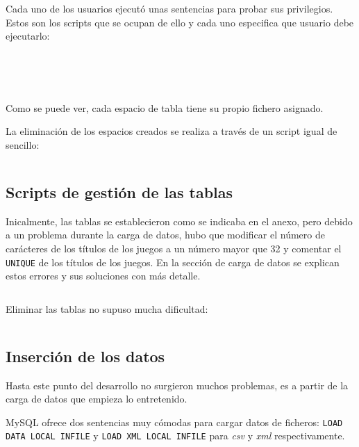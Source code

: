 \documentclass[a4paper, 11pt, oneside]{article} %
\newcommand{\scriptdir}{../scripts/} %
\begin{document}
Cada uno de los usuarios ejecutó unas sentencias para probar sus privilegios. Estos son los scripts que se ocupan de ello y cada uno especifica que usuario debe ejecutarlo:

\inputminted{mysql}{\scriptdir scripts/scripts_consulta_privilegios/gohan_queries.sql}
\inputminted{mysql}{\scriptdir scripts/scripts_consulta_privilegios/vegeta_queries.sql}
\inputminted{mysql}{\scriptdir scripts/scripts_consulta_privilegios/videl_queries.sql}
\inputminted{mysql}{\scriptdir scripts/scripts_consulta_privilegios/trunks_queries.sql}
\inputminted{mysql}{\scriptdir scripts/scripts_consulta_privilegios/goku_queries.sql}


\iffalse

Como se puede ver, cada espacio de tabla tiene su propio fichero asignado.

La eliminación de los espacios creados se realiza a través de un script igual de sencillo:

\inputminted{mysql}{\scriptdir drop_physical.sql}




\subsection{Scripts de gestión de las tablas}

Inicalmente, las tablas se establecieron como se indicaba en el anexo, pero debido a un problema durante la carga de datos, hubo que modificar el número de carácteres de los títulos de los juegos a un número mayor que 32 y comentar el \texttt{UNIQUE} de los títulos de los juegos. En la sección de carga de datos se explican estos errores y sus soluciones con más detalle.

\inputminted{mysql}{\scriptdir set_tables.sql}

Eliminar las tablas no supuso mucha dificultad:

\inputminted{mysql}{\scriptdir drop_tables.sql}




\subsection{Inserción de los datos}

Hasta este punto del desarrollo no surgieron muchos problemas, es a partir de la carga de datos que empieza lo entretenido.

MySQL ofrece dos sentencias muy cómodas para cargar datos de ficheros: \texttt{LOAD DATA LOCAL INFILE} y \texttt{LOAD XML LOCAL INFILE} para \emph{csv} y \emph{xml} respectivamente.
\end{document}

